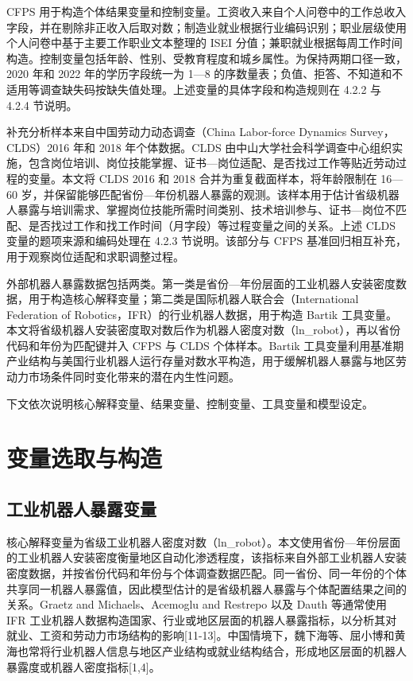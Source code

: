 \documentclass[UTF8, zihao=-4, a4paper, openany, fontset=none]{ctexrep}
\numberwithin{equation}{chapter}
\begin{document}
CFPS 用于构造个体结果变量和控制变量。工资收入来自个人问卷中的工作总收入字段，并在剔除非正收入后取对数；制造业就业根据行业编码识别；职业层级使用个人问卷中基于主要工作职业文本整理的 ISEI 分值；兼职就业根据每周工作时间构造。控制变量包括年龄、性别、受教育程度和城乡属性。为保持两期口径一致，2020 年和 2022 年的学历字段统一为 1---8 的序数量表；负值、拒答、不知道和不适用等调查缺失码按缺失值处理。上述变量的具体字段和构造规则在 4.2.2 与 4.2.4 节说明。

补充分析样本来自中国劳动力动态调查（China Labor-force Dynamics Survey，CLDS）2016 年和 2018 年个体数据。CLDS 由中山大学社会科学调查中心组织实施，包含岗位培训、岗位技能掌握、证书---岗位适配、是否找过工作等贴近劳动过程的变量。本文将 CLDS 2016 和 2018 合并为重复截面样本，将年龄限制在 16---60 岁，并保留能够匹配省份---年份机器人暴露的观测。该样本用于估计省级机器人暴露与培训需求、掌握岗位技能所需时间类别、技术培训参与、证书---岗位不匹配、是否找过工作和找工作时间（月字段）等过程变量之间的关系。上述 CLDS 变量的题项来源和编码处理在 4.2.3 节说明。该部分与 CFPS 基准回归相互补充，用于观察岗位适配和求职调整过程。

外部机器人暴露数据包括两类。第一类是省份---年份层面的工业机器人安装密度数据，用于构造核心解释变量；第二类是国际机器人联合会（International Federation of Robotics，IFR）的行业机器人数据，用于构造 Bartik 工具变量。本文将省级机器人安装密度取对数后作为机器人密度对数（ln\_robot），再以省份代码和年份为匹配键并入 CFPS 与 CLDS 个体样本。Bartik 工具变量利用基准期产业结构与美国行业机器人运行存量对数水平构造，用于缓解机器人暴露与地区劳动力市场条件同时变化带来的潜在内生性问题。

下文依次说明核心解释变量、结果变量、控制变量、工具变量和模型设定。

\section{变量选取与构造}\label{ux53d8ux91cfux9009ux53d6ux4e0eux6784ux9020}

\subsection{工业机器人暴露变量}\label{ux5de5ux4e1aux673aux5668ux4ebaux66b4ux9732ux53d8ux91cf}

核心解释变量为省级工业机器人密度对数（ln\_robot）。本文使用省份---年份层面的工业机器人安装密度衡量地区自动化渗透程度，该指标来自外部工业机器人安装密度数据，并按省份代码和年份与个体调查数据匹配。同一省份、同一年份的个体共享同一机器人暴露值，因此模型估计的是省级机器人暴露与个体配置结果之间的关系。Graetz and Michaels、Acemoglu and Restrepo 以及 Dauth 等通常使用 IFR 工业机器人数据构造国家、行业或地区层面的机器人暴露指标，以分析其对就业、工资和劳动力市场结构的影响{[}11-13{]}。中国情境下，魏下海等、屈小博和黄海也常将行业机器人信息与地区产业结构或就业结构结合，形成地区层面的机器人暴露度或机器人密度指标{[}1,4{]}。
\end{document}

